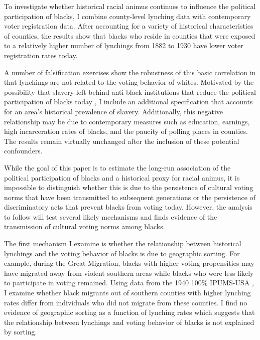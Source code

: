 \documentclass[AEJ, finalmode]{AEA}
\begin{document}
To investigate whether historical racial animus continues to influence the political participation of blacks, I combine county-level lynching data with contemporary voter registration data. After accounting for a variety of historical characteristics of counties, the results show that blacks who reside in counties that were exposed to a relatively higher number of lynchings from 1882 to 1930 have lower voter registration rates today.

A number of falsification exercises show the robustness of this basic correlation in that lynchings are not related to the voting behavior of whites. Motivated by the possibility that slavery left behind anti-black institutions that reduce the political participation of blacks today \cite{acharya2015culture}, I include an additional specification that accounts for an area's historical prevalence of slavery. Additionally, this negative relationship may be due to  contemporary measures such as education, earnings, high incarceration rates of blacks, and the paucity of polling places in counties. The results remain virtually unchanged after the inclusion of these potential confounders.


While the goal of this paper is to estimate the long-run association of the political participation of blacks and a historical proxy for racial animus, it is impossible to distinguish whether this is due to the persistence of cultural voting norms that have been transmitted to subsequent generations or the persistence of discriminatory acts that prevent blacks from voting today. However, the analysis to follow will test several likely mechanisms and finds evidence of the transmission of cultural voting norms among blacks. 


The first mechanism I examine is whether the relationship between historical lynchings and the voting behavior of blacks is due to geographic sorting. For example, during the Great Migration, blacks with higher voting propensities may have migrated away from violent southern areas while blacks who were less likely to participate in voting remained. Using data from the 1940 100\% IPUMS-USA \cite{ipumsacs}, I examine whether black migrants out of southern counties with higher lynching rates differ from individuals who did not migrate from these counties. I find no evidence of geographic sorting as a function of lynching rates which suggests that the relationship between lynchings and voting behavior of blacks is not explained by sorting.
\end{document}
